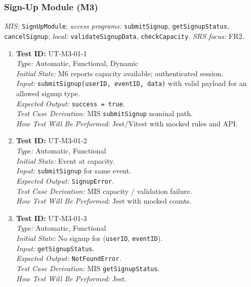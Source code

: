 \documentclass[12pt, titlepage]{article}
\begin{document}
\subsubsection{Sign-Up Module (M3)}

\textit{MIS:} \texttt{SignUpModule}; \textit{access programs:} \texttt{submitSignup}, \texttt{getSignupStatus}, \texttt{cancelSignup}; \textit{local:} \texttt{validateSignupData}, \texttt{checkCapacity}. \textit{SRS focus:} FR2.

\begin{enumerate}\setlength{\itemsep}{0.85em}
    \item \textbf{Test ID:} UT-M3-01-1\\[0.25em]
    \textit{Type:} Automatic, Functional, Dynamic\\
    \textit{Initial State:} M6 reports capacity available; authenticated session.\\
    \textit{Input:} \texttt{submitSignup(userID, eventID, data)} with valid payload for an allowed signup type.\\
    \textit{Expected Output:} \texttt{success = true}.\\
    \textit{Test Case Derivation:} MIS \texttt{submitSignup} nominal path.\\
    \textit{How Test Will Be Performed:} Jest/Vitest with mocked rules and API.

    \item \textbf{Test ID:} UT-M3-01-2\\[0.25em]
    \textit{Type:} Automatic, Functional\\
    \textit{Initial State:} Event at capacity.\\
    \textit{Input:} \texttt{submitSignup} for same event.\\
    \textit{Expected Output:} \texttt{SignupError}.\\
    \textit{Test Case Derivation:} MIS capacity / validation failure.\\
    \textit{How Test Will Be Performed:} Jest with mocked counts.

    \item \textbf{Test ID:} UT-M3-01-3\\[0.25em]
    \textit{Type:} Automatic, Functional\\
    \textit{Initial State:} No signup for (\texttt{userID}, \texttt{eventID}).\\
    \textit{Input:} \texttt{getSignupStatus}.\\
    \textit{Expected Output:} \texttt{NotFoundError}.\\
    \textit{Test Case Derivation:} MIS \texttt{getSignupStatus}.\\
    \textit{How Test Will Be Performed:} Jest.
\end{enumerate}
\end{document}

